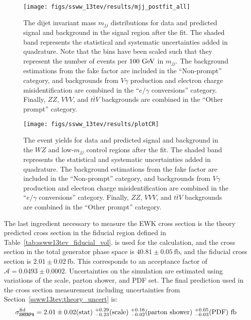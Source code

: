 \begin{figure}[htbp]
  \centering
  \texttt{[image: figs/ssww\_13tev/results/mjj\_postfit\_all]}
  \caption{The dijet invariant mass $m_{jj}$ distributions for data and predicted signal and background in the signal region after the fit.  The shaded band represents the statistical and systematic uncertainties added in quadrature.  Note that the bins have been scaled such that they represent the number of events per $100\gev$ in $m_{jj}$.  The background estimations from the fake factor are included in the ``Non-prompt'' category, and backgrounds from  $V\gamma$ production and electron charge misidentification are combined in the ``$e/\gamma$ conversions'' category.  Finally, $ZZ$, $VVV$, and $t\bar{t}V$ backgrounds are combined in the ``Other prompt'' category.}
  \label{fig:ssww13tev_results_mjj_sr_postfit}
\end{figure}

\begin{figure}[htbp]
  \centering
  \texttt{[image: figs/ssww\_13tev/results/plotCR]}
  \caption{The event yields for data and predicted signal and background in the $WZ$ and low-$m_{jj}$ control regions after the fit.  The shaded band represents the statistical and systematic uncertainties added in quadrature.  The background estimations from the fake factor are included in the ``Non-prompt'' category, and backgrounds from  $V\gamma$ production and electron charge misidentification are combined in the ``$e/\gamma$ conversions'' category.  Finally, $ZZ$, $VVV$, and $t\bar{t}V$ backgrounds are combined in the ``Other prompt'' category.}
  \label{fig:ssww13tev_results_cr_postfit}
\end{figure}

The last ingredient necessary to measure the \ssww EWK cross section is the theory predicted cross section in the fiducial region defined in Table~\ref{tab:ssww13tev_fiducial_vol}.
 is used for the calculation, and the cross section in the total generator phase space is $40.81\pm 0.05~\textrm{fb}$, and the fiducial cross section is $2.01\pm 0.02~\textrm{fb}$.
This corresponds to an acceptance factor of $\mathcal{A} = 0.0493\pm 0.0002$.
Uncertainties on the simulation are estimated using variations of the scale, parton shower, and PDF set.
The final prediction used in the cross section measurement including uncertainties from Section~\ref{ssww13tev:theory_uncert} is:
\begin{equation}
  \sigma_{\tt{SHERPA}}^{\textrm{fid}} = 2.01 \pm 0.02(\textrm{stat})~^{+0.29}_{-0.23} (\textrm{scale})~^{+0.16}_{-0.02}(\textrm{parton shower})~^{+0.05}_{-0.03} (\textrm{PDF})~\textrm{fb}
  \label{eq:ssww13tev_fiducial_xsec_theory}
\end{equation}

